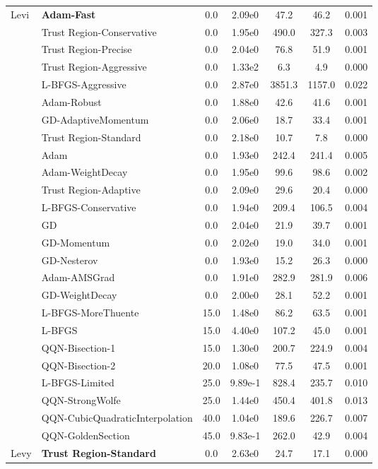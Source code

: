 \documentclass{article}
\begin{document}
\begin{table}[htbp]
{\begin{tabular}{p{2.5cm}p{2.5cm}*{5}{c}}
\midrule
\multirow{25}{*}{Levi} & \textbf{Adam-Fast} & 0.0 & 2.09e0 & 47.2 & 46.2 & 0.001 \\
 & Trust Region-Conservative & 0.0 & 1.95e0 & 490.0 & 327.3 & 0.003 \\
 & Trust Region-Precise & 0.0 & 2.04e0 & 76.8 & 51.9 & 0.001 \\
 & Trust Region-Aggressive & 0.0 & 1.33e2 & 6.3 & 4.9 & 0.000 \\
 & L-BFGS-Aggressive & 0.0 & 2.87e0 & 3851.3 & 1157.0 & 0.022 \\
 & Adam-Robust & 0.0 & 1.88e0 & 42.6 & 41.6 & 0.001 \\
 & GD-AdaptiveMomentum & 0.0 & 2.06e0 & 18.7 & 33.4 & 0.001 \\
 & Trust Region-Standard & 0.0 & 2.18e0 & 10.7 & 7.8 & 0.000 \\
 & Adam & 0.0 & 1.93e0 & 242.4 & 241.4 & 0.005 \\
 & Adam-WeightDecay & 0.0 & 1.95e0 & 99.6 & 98.6 & 0.002 \\
 & Trust Region-Adaptive & 0.0 & 2.09e0 & 29.6 & 20.4 & 0.000 \\
 & L-BFGS-Conservative & 0.0 & 1.94e0 & 209.4 & 106.5 & 0.004 \\
 & GD & 0.0 & 2.04e0 & 21.9 & 39.7 & 0.001 \\
 & GD-Momentum & 0.0 & 2.02e0 & 19.0 & 34.0 & 0.001 \\
 & GD-Nesterov & 0.0 & 1.93e0 & 15.2 & 26.3 & 0.000 \\
 & Adam-AMSGrad & 0.0 & 1.91e0 & 282.9 & 281.9 & 0.006 \\
 & GD-WeightDecay & 0.0 & 2.00e0 & 28.1 & 52.2 & 0.001 \\
 & L-BFGS-MoreThuente & 15.0 & 1.48e0 & 86.2 & 63.5 & 0.001 \\
 & L-BFGS & 15.0 & 4.40e0 & 107.2 & 45.0 & 0.001 \\
 & QQN-Bisection-1 & 15.0 & 1.30e0 & 200.7 & 224.9 & 0.004 \\
 & QQN-Bisection-2 & 20.0 & 1.08e0 & 77.5 & 47.5 & 0.001 \\
 & L-BFGS-Limited & 25.0 & 9.89e-1 & 828.4 & 235.7 & 0.010 \\
 & QQN-StrongWolfe & 25.0 & 1.44e0 & 450.4 & 401.8 & 0.013 \\
 & QQN-CubicQuadraticInterpolation & 40.0 & 1.04e0 & 189.6 & 226.7 & 0.007 \\
 & QQN-GoldenSection & 45.0 & 9.83e-1 & 262.0 & 42.9 & 0.004 \\
\midrule
\multirow{25}{*}{Levy} & \textbf{Trust Region-Standard} & 0.0 & 2.63e0 & 24.7 & 17.1 & 0.000 \\

\end{tabular}}
\end{table}
\end{document}

